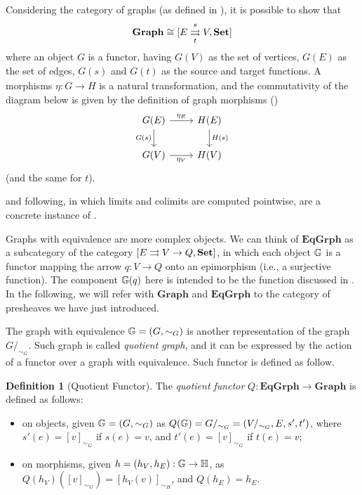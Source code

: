 \documentclass[a4paper, twoside,openright]{report}
\theoremstyle{plain}
\theoremstyle{definition}
\newtheorem{definition}[theorem]{Definition}
\begin{document}
Considering the category of graphs (as defined in ), it is possible to show that 
$$\mathbf{Graph} \cong [E \mathrel{\mathop{\rightrightarrows}^{s}_{t}} V , \mathbf{Set}]$$
where an object $G$ is a functor, having $G(V)$ as the set of vertices, $G(E)$ as the set of edges, $G(s)$ and $G(t)$ as the source and target functions. A morphisms $\eta: G \dot\rightarrow H$ is a natural transformation, and the commutativity of the diagram below is given by the definition of graph morphisms ()
$$
    \begin{tikzcd}
        G(E) \arrow[r, "{\eta_E}"] \arrow[d, "G(s)"swap] & H(E) \arrow[d, "H(s)"] \\
        G(V) \arrow[r, "{\eta_V}"swap] & H(V)
    \end{tikzcd}
$$
(and the same for $t$).

 and following, in which limits and colimits are computed pointwise, are a concrete instance of .

Graphs with equivalence are more complex objects. We can think of $\mathbf{EqGrph}$ as a subcategory of the category $[E \rightrightarrows V \rightarrow Q, \mathbf{Set}]$, in which each object $\mathbb{G}$ is a functor mapping the arrow $q: V \rightarrow Q$ onto an epimorphism (i.e., a surjective function). The component $\mathbb{G}(q)$ here is intended to be the function discussed in .
In the following, we will refer with $\mathbf{Graph}$ and $\mathbf{EqGrph}$ to the category of presheaves we have just introduced.


The graph with equivalence $\mathbb{G} = (G, \sim_G)$ is another representation of the graph $G/_{\sim_G}$. Such graph is called \emph{quotient graph}, and it can be expressed by the action of a functor over a graph with equivalence. Such functor is defined as follow.

\begin{definition}[Quotient Functor]\label{def:quot_func}
    The \emph{quotient functor} $Q: \mathbf{EqGrph} \rightarrow \mathbf{Graph}$ is defined as follows:
    \begin{itemize}
        \item on objects, given $\mathbb{G}=(G, \sim_{G})$ as $Q(\mathbb{G}) = G/_{\sim_G} = (V/_{\sim_G}, E, s', t')$, where $s'(e) = [v]_{\sim_G}$ if $s(e) = v$, and $t'(e) = [v]_{\sim_G}$ if $t(e) = v$;
        \item on morphisms, given $h = (h_V, h_E): \mathbb{G \rightarrow H}$, as $Q(h_V)([v]_{\sim_G}) = [h_V(v)]_{\sim_H}$, and $Q(h_E) = h_E$.
    \end{itemize}
\end{definition}
\end{document}
